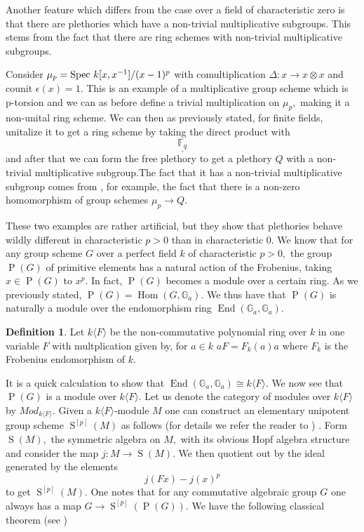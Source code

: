 \documentclass[a4paper, 12pt]{amsart}
\DeclareMathOperator{\Prim}{P}
\DeclareMathOperator{\Sym}{S}
\DeclareMathOperator{\End}{End}
\newcommand{\Hom}{{\operatorname{Hom}}}
\numberwithin{equation}{section}
\theoremstyle{definition}
\newtheorem{definition}[theorem]{Definition}
\begin{document}
\noindent Another feature which differs from the case over a field of characteristic zero is that there are plethories which have a non-trivial multiplicative subgroups. This stems from the fact that there are ring schemes with non-trivial multiplicative subgroups.
\begin{example}
Consider $\mu_p = \text{Spec } k[x,x^{-1}]/(x-1)^p$ with comultiplication $\Delta:x \rightarrow x \otimes x$ and counit $\epsilon(x) = 1.$ This is an example of a multiplicative group scheme which is p-torsion and we can as before define a trivial multiplication on $\mu_p,$ making it a non-unital ring scheme. We can then as previously stated, for finite fields, unitalize it to get a ring scheme by taking the direct product with $$\underline{\mathbb{F}_q}$$and after that we can form the free plethory to get a plethory $Q$ with a non-trivial multiplicative subgroup.The fact that it has a non-trivial multiplicative subgroup comes from , for example, the fact that there is a non-zero homomorphism of group schemes $\mu_p \rightarrow Q.$  
\end{example}
\noindent These two examples are rather artificial, but they show that plethories behave wildly different in characteristic $p >0$ than in characteristic $0.$
We know that for any group scheme $G$ over a perfect field $k$ of characteristic $p>0 ,$ the group $\Prim(G)$ of primitive elements has a natural action of the Frobenius, taking $x \in \Prim(G)$ to $x^p.$ In fact, $\Prim(G)$ becomes a module over a certain ring. As we previously stated, $\Prim(G) = \Hom(G, \mathbb{G}_a).$ We thus have that $\Prim(G)$ is naturally a module over the endomorphism ring $\End(\mathbb{G}_a,\mathbb{G}_a).$ 
\begin{definition}
Let $k\langle F \rangle$ be the non-commutative polynomial ring over $k$ in one variable $F$ with multplication given by, for $a \in k$ $aF = F_k(a)a$ where $F_k$ is the Frobenius endomorphism of $k.$
\end{definition}
\noindent It is a quick calculation to show that $\End(\mathbb{G}_a,\mathbb{G}_a) \cong k\langle F \rangle.$ We now see that $\Prim(G)$ is a module over $k\langle F \rangle.$  Let us denote the category of modules over $k\langle F \rangle$ by $Mod_{k\langle F \rangle}.$ Given a $k\langle F \rangle$-module $M$ one can construct an elementary unipotent group scheme $\Sym^{[p]}(M)$ as follows (for details we refer the reader to \cite{MilneiAG}) . Form $\Sym(M),$ the symmetric algebra on $M,$ with its obvious Hopf algebra structure and consider the map $j:M \rightarrow \Sym(M).$ We then quotient out by the ideal generated by the elements $$j(Fx)-j(x)^p$$ to get $\Sym^{[p]}(M).$  One notes that for any commutative algebraic group $G$ one always has a map $G \rightarrow \Sym^{[p]}(\Prim(G)).$ We have the following classical theorem (see \cite[IV,$\mathsection 3,$ Proposition $6.6$]{DemazureG})
\end{document}
